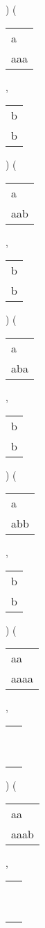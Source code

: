 ) 
 ( 
\begin{tabular}{|l|} \hline
a\ \  \\
aaa \\
\hline
\end{tabular} 
 , 
\begin{tabular}{|l|} \hline
b \\
b \\
\hline
\end{tabular} 
) 
 ( 
\begin{tabular}{|l|} \hline
a\ \  \\
aab \\
\hline
\end{tabular} 
 , 
\begin{tabular}{|l|} \hline
b \\
b \\
\hline
\end{tabular} 
) 
 ( 
\begin{tabular}{|l|} \hline
a\ \  \\
aba \\
\hline
\end{tabular} 
 , 
\begin{tabular}{|l|} \hline
b \\
b \\
\hline
\end{tabular} 
) 
 ( 
\begin{tabular}{|l|} \hline
a\ \  \\
abb \\
\hline
\end{tabular} 
 , 
\begin{tabular}{|l|} \hline
b \\
b \\
\hline
\end{tabular} 
) 
 ( 
\begin{tabular}{|l|} \hline
aa\ \  \\
aaaa \\
\hline
\end{tabular} 
 , 
\begin{tabular}{|l|} \hline
\ \\ \ \\ \hline
\end{tabular} 
) 
 ( 
\begin{tabular}{|l|} \hline
aa\ \  \\
aaab \\
\hline
\end{tabular} 
 , 
\begin{tabular}{|l|} \hline
\ \\ \ \\ \hline
\end{tabular} 
